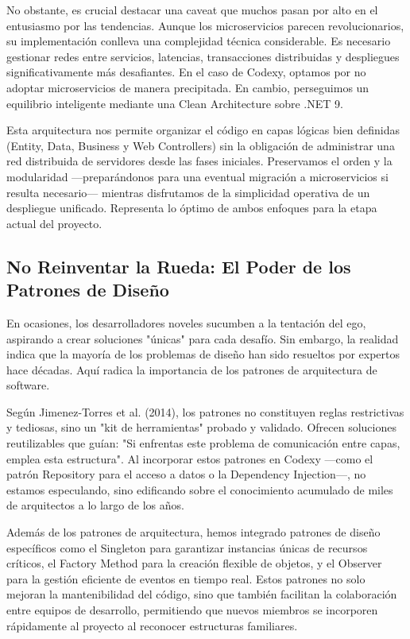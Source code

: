 No obstante, es crucial destacar una caveat que muchos pasan por alto en el entusiasmo por las tendencias. Aunque los microservicios parecen revolucionarios, su implementación conlleva una complejidad técnica considerable. Es necesario gestionar redes entre servicios, latencias, transacciones distribuidas y despliegues significativamente más desafiantes. En el caso de Codexy, optamos por no adoptar microservicios de manera precipitada. En cambio, perseguimos un equilibrio inteligente mediante una Clean Architecture sobre .NET 9.

Esta arquitectura nos permite organizar el código en capas lógicas bien definidas (Entity, Data, Business y Web Controllers) sin la obligación de administrar una red distribuida de servidores desde las fases iniciales. Preservamos el orden y la modularidad —preparándonos para una eventual migración a microservicios si resulta necesario— mientras disfrutamos de la simplicidad operativa de un despliegue unificado. Representa lo óptimo de ambos enfoques para la etapa actual del proyecto.

\subsection{No Reinventar la Rueda: El Poder de los Patrones de Diseño}

En ocasiones, los desarrolladores noveles sucumben a la tentación del ego, aspirando a crear soluciones "únicas" para cada desafío. Sin embargo, la realidad indica que la mayoría de los problemas de diseño han sido resueltos por expertos hace décadas. Aquí radica la importancia de los patrones de arquitectura de software.

Según Jimenez-Torres et al. (2014), los patrones no constituyen reglas restrictivas y tediosas, sino un "kit de herramientas" probado y validado. Ofrecen soluciones reutilizables que guían: "Si enfrentas este problema de comunicación entre capas, emplea esta estructura". Al incorporar estos patrones en Codexy —como el patrón Repository para el acceso a datos o la Dependency Injection—, no estamos especulando, sino edificando sobre el conocimiento acumulado de miles de arquitectos a lo largo de los años.

Además de los patrones de arquitectura, hemos integrado patrones de diseño específicos como el Singleton para garantizar instancias únicas de recursos críticos, el Factory Method para la creación flexible de objetos, y el Observer para la gestión eficiente de eventos en tiempo real. Estos patrones no solo mejoran la mantenibilidad del código, sino que también facilitan la colaboración entre equipos de desarrollo, permitiendo que nuevos miembros se incorporen rápidamente al proyecto al reconocer estructuras familiares.

